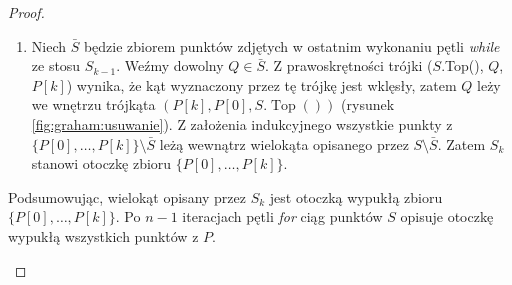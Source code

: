 \begin{theorem}
\begin{proof}
\begin{enumerate}
\begin{itemize}
\begin{enumerate}
					\item Niech $\bar{S}$ będzie zbiorem punktów zdjętych w ostatnim wykonaniu pętli \textit{while} ze stosu $S_{k-1}$.
					Weźmy dowolny $Q \in \bar{S}$. Z prawoskrętności trójki ($S$.Top(), $Q$, $P[k]$) wynika, że kąt wyznaczony przez tę trójkę jest wklęsły, zatem $Q$ leży we wnętrzu trójkąta $(P[k], P[0], S.\operatorname{Top}())$ (rysunek \ref{fig:graham:usuwanie}). Z założenia indukcyjnego wszystkie punkty z $\{P[0], \dots, P[k]\} \setminus \bar{S}$ leżą wewnątrz wielokąta opisanego przez $S \setminus \bar{S}$. Zatem $S_k$ stanowi otoczkę zbioru $\{P[0], \dots, P[k]\}$.
				\end{enumerate}				
			\end{itemize}
			Podsumowując, wielokąt opisany przez $S_k$ jest otoczką wypukłą zbioru $\{P[0], \dots, P[k]\}$. Po $n-1$ iteracjach pętli \textit{for} ciąg punktów $S$ opisuje otoczkę wypukłą wszystkich punktów z $P$. \qedhere
		\end{enumerate}
	\end{proof}
\end{theorem}

